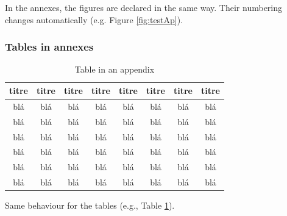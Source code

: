 \documentclass[letterpaper%
, twoside%
, 12pt%
,thesepararticles%
, english%
,creativecommons,hyperref, withAlgo2e%
]{thETS}
\begin{document}
In the annexes, the figures are declared in the same way. Their numbering changes automatically (e.g. Figure \ref{fig:testAp}).

\subsubsection{Tables in annexes}

\begin{table}
		\parbox{0.65\textwidth}{\caption{Table in an appendix}\label{tab:testAp}}

		\begin{tabular}{|c|c|c|c|c|c|c|c|}
		\hline
			{\bf titre} & {\bf titre} & {\bf titre} & {\bf titre} & {\bf titre} & {\bf titre} & {\bf titre} & {\bf titre} \\
	  \hline
			blá & blá & blá & blá & blá & blá & blá & blá \\
	  \hline
			blá & blá & blá & blá & blá & blá & blá & blá \\
	  \hline
			blá & blá & blá & blá & blá & blá & blá & blá \\
	  \hline
			blá & blá & blá & blá & blá & blá & blá & blá \\
	  \hline
			blá & blá & blá & blá & blá & blá & blá & blá \\
	  \hline
			blá & blá & blá & blá & blá & blá & blá & blá \\
	  \hline
		\end{tabular}
\end{table}

Same behaviour for the tables (e.g., Table \ref{tab:testAp}).



\newpage
\begin{spacing}{1}
    \setlength{\bibsep}{\baselineskip}
	\nocite{*} %


\end{spacing}
\end{document}
